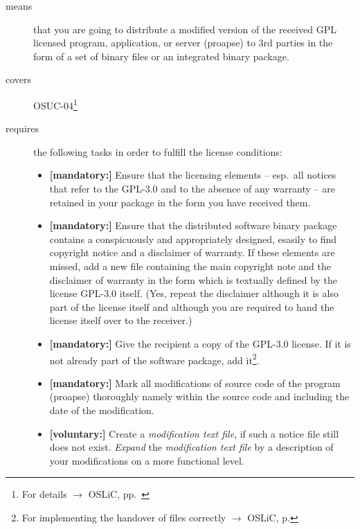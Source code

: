 \begin{description}
\item[means] that you are going to distribute a modified version of the received
GPL licensed pro\-gram, application, or server (proapse) to 3rd parties in
the form of a set of binary files or an integrated binary package.
\item[covers] OSUC-04\footnote{For details $\rightarrow$ OSLiC, pp.\ \pageref{OSUC-04-DEF}}

\item[requires] the following tasks in order to fulfill the license conditions:
\begin{itemize}

  \item \textbf{[mandatory:]} Ensure that the licensing elements -- esp.\ all
  notices that refer to the GPL-3.0 and to the absence of any
  warranty -- are retained in your package in the form you have received them.

  \item \textbf{[mandatory:]} Ensure that the distributed software binary
  package contains a conspicuously and appropriately designed, esasily to find
  copyright notice and a disclaimer of warranty. If these elements are missed,
  add a new file containing the main copyright note and the disclaimer of
  warranty in the form which is textually defined by the license GPL-3.0 itself.
  (Yes, repeat the disclaimer although it is also part of the license itself and
  although you are required to hand the license itself over to the receiver.)
  
  \item \textbf{[mandatory:]} Give the recipient a copy of the GPL-3.0 license.
  If it is not already part of the software package, add it\footnote{For
  implementing the handover of files correctly $\rightarrow$ OSLiC, p.
  \pageref{DistributingFilesHint}}.



  \item \textbf{[mandatory:]} Mark all modifications of source code of the
  program (proapse) thoroughly namely within the source code and including
  the date of the modification.
  
  \item \textbf{[voluntary:]} Create a \emph{modification text file}, if such a
  notice file still does not exist. \emph{Expand} the \emph{modification text
  file} by a description of your modifications on a more functional level.
  

\end{itemize}
\end{description}
